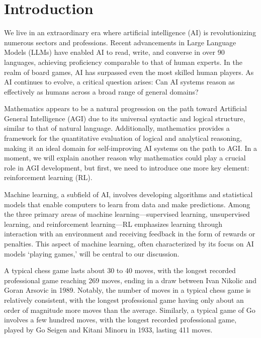 
\section{Introduction\label{sec:intro}}

We live in an extraordinary era where artificial intelligence (AI) is revolutionizing numerous sectors and professions. Recent advancements in Large Language Models (LLMs) have enabled AI to read, write, and converse in over 90 languages, achieving proficiency comparable to that of human experts. In the realm of board games, AI has surpassed even the most skilled human players. As AI continues to evolve, a critical question arises: Can AI systems reason as effectively as humans across a broad range of general domains?

Mathematics appears to be a natural progression on the path toward Artificial General Intelligence (AGI) due to its universal syntactic and logical structure, similar to that of natural language. Additionally, mathematics provides a framework for the quantitative evaluation of logical and analytical reasoning, making it an ideal domain for self-improving AI systems on the path to AGI. In a moment, we will explain another reason why mathematics could play a crucial role in AGI development, but first, we need to introduce one more key element: reinforcement learning (RL).

Machine learning, a subfield of AI, involves developing algorithms and statistical models that enable computers to learn from data and make predictions. Among the three primary areas of machine learning---supervised learning, unsupervised learning, and reinforcement learning---RL emphasizes learning through interaction with an environment and receiving feedback in the form of rewards or penalties. This aspect of machine learning, often characterized by its focus on AI models `playing games,’ will be central to our discussion.

A typical chess game lasts about 30 to 40 moves, with the longest recorded professional game reaching 269 moves, ending in a draw between Ivan Nikolic and Goran Arsovic in 1989. Notably, the number of moves in a typical chess game is relatively consistent, with the longest professional game having only about an order of magnitude more moves than the average. Similarly, a typical game of Go involves a few hundred moves, with the longest recorded professional game, played by Go Seigen and Kitani Minoru in 1933, lasting 411 moves.

